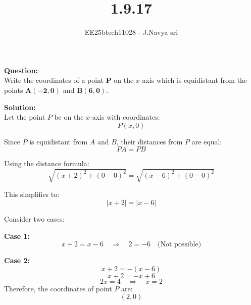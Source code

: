 \documentclass[journal]{IEEEtran}
\begin{document}

\vspace{3cm}

\title{1.9.17}
\author{EE25btech11028 - J.Navya sri}
{\let\newpage\relax\maketitle}

\renewcommand{\thefigure}{\theenumi}
\renewcommand{\thetable}{\theenumi}
\setlength{\intextsep}{10pt} %


\bigskip
\textbf{Question:} \\
Write the coordinates of a point $\mathbf{P}$ on the $x$-axis which is equidistant from the points $\mathbf{A(-2, 0)}$ and $\mathbf{B(6, 0)}$.

\bigskip

\textbf{Solution:} \\

Let the point $P$ be on the $x$-axis with coordinates:
\begin{equation}
P(x, 0)
\end{equation}

Since $P$ is equidistant from $A$ and $B$, their distances from $P$ are equal:
\begin{equation}
PA = PB
\end{equation}

Using the distance formula:
\begin{equation}
\sqrt{(x + 2)^2 + (0 - 0)^2} = \sqrt{(x - 6)^2 + (0 - 0)^2}
\end{equation}

This simplifies to:
\begin{equation}
|x + 2| = |x - 6|
\end{equation}

Consider two cases:

\textbf{Case 1:}
\begin{equation}
x + 2 = x - 6 \quad \Rightarrow \quad 2 = -6 \quad \text{(Not possible)}
\end{equation}

\textbf{Case 2:}
\begin{equation}
x + 2 = -(x - 6) 
\end{equation}
\[ x + 2 = -x + 6 \] 
\[ 2x = 4 \quad \Rightarrow \quad x = 2 \]
Therefore, the coordinates of point $P$ are:
\begin{equation}
\boxed{(2, 0)}
\end{equation}
\end{document}
